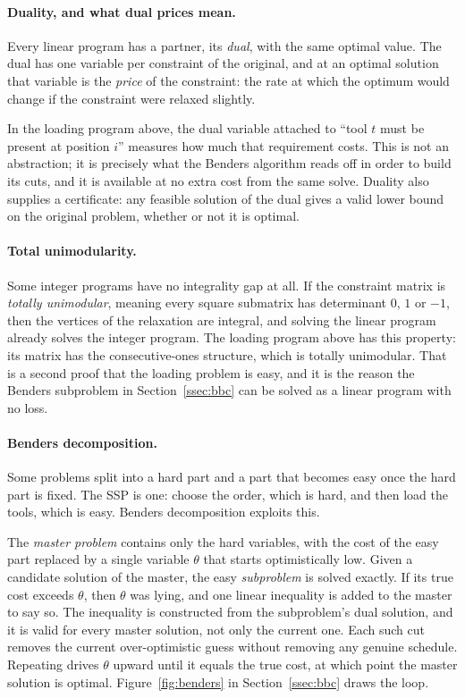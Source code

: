 \paragraph{Duality, and what dual prices mean.}
Every linear program has a partner, its \emph{dual}, with the same optimal value.
The dual has one variable per constraint of the original, and at an optimal solution
that variable is the \emph{price} of the constraint: the rate at which the optimum
would change if the constraint were relaxed slightly.

In the loading program above, the dual variable attached to ``tool $t$ must be
present at position $i$'' measures how much that requirement costs. This is not an
abstraction; it is precisely what the Benders algorithm reads off in order to build
its cuts, and it is available at no extra cost from the same solve. Duality also
supplies a certificate: any feasible solution of the dual gives a valid lower bound
on the original problem, whether or not it is optimal.

\paragraph{Total unimodularity.}
Some integer programs have no integrality gap at all. If the constraint matrix is
\emph{totally unimodular}, meaning every square submatrix has determinant $0$, $1$ or
$-1$, then the vertices of the relaxation are integral, and solving the linear
program already solves the integer program. The loading program above has this
property: its matrix has the consecutive-ones structure, which is totally unimodular.
That is a second proof that the loading problem is easy, and it is the reason the
Benders subproblem in Section~\ref{ssec:bbc} can be solved as a linear program with
no loss.

\paragraph{Benders decomposition.}
Some problems split into a hard part and a part that becomes easy once the hard part
is fixed. The SSP is one: choose the order, which is hard, and then load the tools,
which is easy. Benders decomposition exploits this.

The \emph{master problem} contains only the hard variables, with the cost of the easy
part replaced by a single variable $\theta$ that starts optimistically low. Given a
candidate solution of the master, the easy \emph{subproblem} is solved exactly. If
its true cost exceeds $\theta$, then $\theta$ was lying, and one linear inequality is
added to the master to say so. The inequality is constructed from the subproblem's
dual solution, and it is valid for every master solution, not only the current one.
Each such cut removes the current over-optimistic guess without removing any genuine
schedule. Repeating drives $\theta$ upward until it equals the true cost, at which
point the master solution is optimal. Figure~\ref{fig:benders} in
Section~\ref{ssec:bbc} draws the loop.

